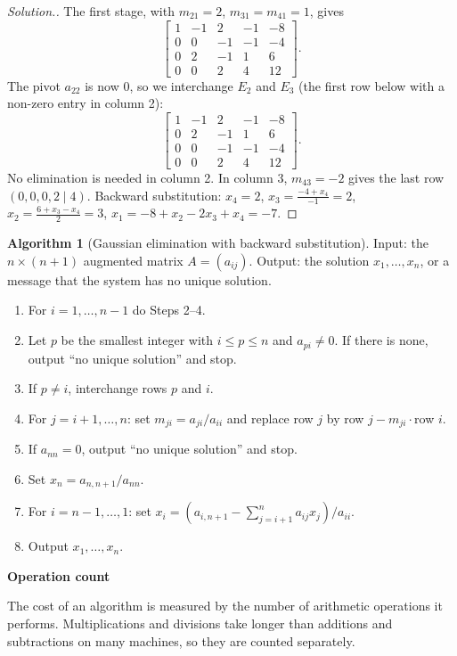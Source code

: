 \documentclass[11pt,a4paper]{article}
\numberwithin{equation}{section}
\theoremstyle{definition}
\newtheorem{alg}[thm]{Algorithm}
\newenvironment{solution}
  {\renewcommand{\qedsymbol}{}\begin{proof}[\textit{Solution}.]}
  {\end{proof}}
\newcommand{\subhead}[1]{%
  \par\medskip\noindent\textbf{#1}\par\nobreak\smallskip}
\begin{document}
\begin{solution}
The first stage, with $m_{21} = 2$, $m_{31} = m_{41} = 1$, gives
$$\left[\begin{array}{rrrr|r}1&-1&2&-1&-8\\0&0&-1&-1&-4\\0&2&-1&1&6\\0&0&2&4&12\end{array}\right].$$
The pivot $a_{22}$ is now $0$, so we interchange $E_2$ and $E_3$ (the first row below with a non-zero entry in column 2):
$$\left[\begin{array}{rrrr|r}1&-1&2&-1&-8\\0&2&-1&1&6\\0&0&-1&-1&-4\\0&0&2&4&12\end{array}\right].$$
No elimination is needed in column 2. In column 3, $m_{43} = -2$ gives the last row $(0,0,0,2\mid4)$. Backward substitution:
$x_4 = 2$, $x_3 = \frac{-4+x_4}{-1} = 2$, $x_2 = \frac{6+x_3-x_4}{2} = 3$, $x_1 = -8+x_2-2x_3+x_4 = -7$.
\end{solution}

\begin{alg}[Gaussian elimination with backward substitution]
\label{alg:gauss}
Input: the $n\times(n+1)$ augmented matrix $A = (a_{ij})$. Output: the solution $x_1,\dots,x_n$, or a message that the system has no
unique solution.
\begin{enumerate}[label=Step \arabic*:,leftmargin=*]
\item For $i = 1,\dots,n-1$ do Steps 2--4.
\item Let $p$ be the smallest integer with $i\leq p\leq n$ and $a_{pi}\neq0$. If there is none, output ``no unique solution'' and stop.
\item If $p\neq i$, interchange rows $p$ and $i$.
\item For $j = i+1,\dots,n$: set $m_{ji} = a_{ji}/a_{ii}$ and replace row $j$ by row $j-m_{ji}\cdot$row $i$.
\item If $a_{nn} = 0$, output ``no unique solution'' and stop.
\item Set $x_n = a_{n,n+1}/a_{nn}$.
\item For $i = n-1,\dots,1$: set $x_i = \left(a_{i,n+1}-\sum_{j=i+1}^na_{ij}x_j\right)\big/a_{ii}$.
\item Output $x_1,\dots,x_n$.
\end{enumerate}
\end{alg}

\subhead{Operation count}
The cost of an algorithm is measured by the number of arithmetic operations it performs. Multiplications and divisions take longer than
additions and subtractions on many machines, so they are counted separately.
\end{document}
